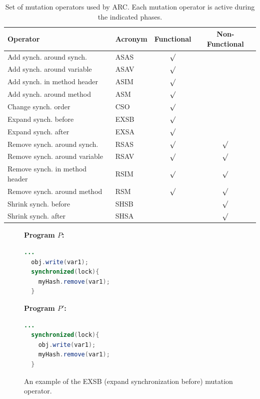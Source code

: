 \documentclass{llncs}
\begin{document}
\begin{table}[h]
\caption{Set of mutation operators used by ARC. Each mutation operator is
active during the indicated phases.}
\begin{center}
\begin{tabular}{|l|l|c|c|}
\hline
\textbf{Operator} & \textbf{Acronym} & \textbf{Functional} & \textbf{Non-Functional}\\
\hline
Add synch. around synch. & ASAS & $\surd$ &\\
\hline
Add synch. around variable & ASAV & $\surd$ &\\
\hline
Add synch. in method header & ASIM & $\surd$ &\\
\hline
Add synch. around method & ASM & $\surd$ &\\
\hline
Change synch. order & CSO & $\surd$ &\\
\hline
Expand synch. before & EXSB & $\surd$ &\\
\hline
Expand synch. after & EXSA & $\surd$ &\\
\hline
Remove synch. around synch. & RSAS & $\surd$ & $\surd$\\
\hline
Remove synch. around variable & RSAV & $\surd$ & $\surd$\\
\hline
Remove synch. in method header & RSIM & $\surd$ & $\surd$\\
\hline
Remove synch. around method & RSM & $\surd$ & $\surd$\\
\hline
Shrink synch. before & SHSB & & $\surd$\\
\hline
Shrink synch. after & SHSA & & $\surd$\\
\hline
\end{tabular}
\label{tbl:operators}
\end{center}
\end{table}

\begin{figure}[h]
\vspace{2mm}
\begin{minipage}{5cm}

\footnotesize{\textbf{ Program $P$:}}
\begin{lstlisting}[language=Java, morekeywords={synchronize}]
  ...
  obj.write(var1);
  synchronized(lock){
    myHash.remove(var1);
  }
\end{lstlisting}
\end{minipage}\hfill
\begin{minipage}{5cm}
\footnotesize{\textbf{ Program $P'$:}}
\begin{lstlisting}[language=Java, morekeywords={synchronize}]
  ...
  synchronized(lock){
    obj.write(var1);
    myHash.remove(var1);
  }
\end{lstlisting}
\end{minipage}

\caption{An example of the EXSB (expand synchronization before) mutation
operator.}
\label{fig:EXSB_example}
\end{figure}
\end{document}

